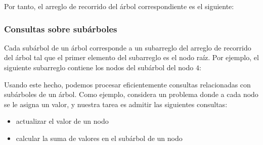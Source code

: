 Por tanto, el arreglo de recorrido del árbol correspondiente es el siguiente:
\begin{center}
\end{center}

\subsubsection{Consultas sobre subárboles}

Cada subárbol de un árbol corresponde a un subarreglo
del arreglo de recorrido del árbol tal que
el primer elemento del subarreglo es el nodo raíz.
Por ejemplo, el siguiente subarreglo contiene los
nodos del subárbol del nodo $4$:
\begin{center}
\end{center}
Usando este hecho, podemos procesar eficientemente consultas
relacionadas con subárboles de un árbol.
Como ejemplo, considera un problema donde a cada nodo
se le asigna un valor, y nuestra tarea es admitir
las siguientes consultas:
\begin{itemize}
\item actualizar el valor de un nodo
\item calcular la suma de valores en el subárbol de un nodo
\end{itemize}

